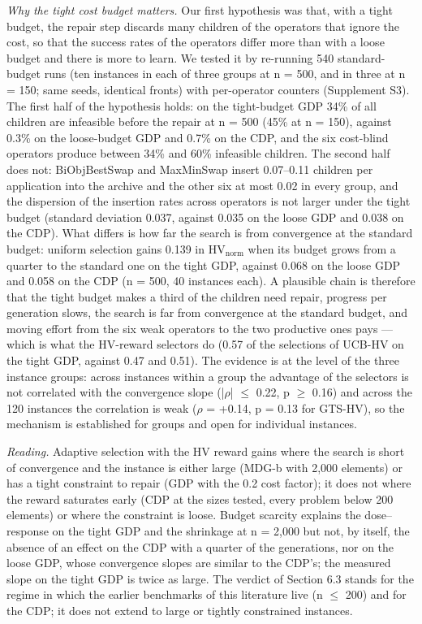 \emph{Why the tight cost budget matters.} Our first hypothesis was that, with a tight budget, the repair step discards many children of the operators that ignore the cost, so that the success rates of the operators differ more than with a loose budget and there is more to learn. We tested it by re-running 540 standard-budget runs (ten instances in each of three groups at n = 500, and in three at n = 150; same seeds, identical fronts) with per-operator counters (Supplement S3). The first half of the hypothesis holds: on the tight-budget GDP 34\% of all children are infeasible before the repair at n = 500 (45\% at n = 150), against 0.3\% on the loose-budget GDP and 0.7\% on the CDP, and the six cost-blind operators produce between 34\% and 60\% infeasible children. The second half does not: BiObjBestSwap and MaxMinSwap insert 0.07--0.11 children per application into the archive and the other six at most 0.02 in every group, and the dispersion of the insertion rates across operators is not larger under the tight budget (standard deviation 0.037, against 0.035 on the loose GDP and 0.038 on the CDP). What differs is how far the search is from convergence at the standard budget: uniform selection gains 0.139 in $\mathrm{HV}_{\mathrm{norm}}$ when its budget grows from a quarter to the standard one on the tight GDP, against 0.068 on the loose GDP and 0.058 on the CDP (n = 500, 40 instances each). A plausible chain is therefore that the tight budget makes a third of the children need repair, progress per generation slows, the search is far from convergence at the standard budget, and moving effort from the six weak operators to the two productive ones pays --- which is what the HV-reward selectors do (0.57 of the selections of UCB-HV on the tight GDP, against 0.47 and 0.51). The evidence is at the level of the three instance groups: across instances within a group the advantage of the selectors is not correlated with the convergence slope (|$\rho$| $\leq$ 0.22, p $\geq$ 0.16) and across the 120 instances the correlation is weak ($\rho$ = +0.14, p = 0.13 for GTS-HV), so the mechanism is established for groups and open for individual instances.

\emph{Reading.} Adaptive selection with the HV reward gains where the search is short of convergence and the instance is either large (MDG-b with 2,000 elements) or has a tight constraint to repair (GDP with the 0.2 cost factor); it does not where the reward saturates early (CDP at the sizes tested, every problem below 200 elements) or where the constraint is loose. Budget scarcity explains the dose--response on the tight GDP and the shrinkage at n = 2,000 but not, by itself, the absence of an effect on the CDP with a quarter of the generations, nor on the loose GDP, whose convergence slopes are similar to the CDP's; the measured slope on the tight GDP is twice as large. The verdict of Section 6.3 stands for the regime in which the earlier benchmarks of this literature live (n $\leq$ 200) and for the CDP; it does not extend to large or tightly constrained instances.

